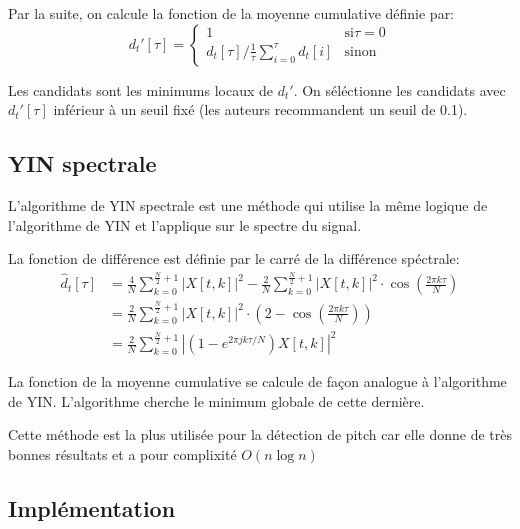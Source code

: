 \documentclass[]{article}
\begin{document}
Par la suite, on calcule la fonction de la moyenne cumulative définie
par: \[d_t'[\tau] = \begin{cases} 1 &\text{si} \tau = 0\\
d_t[\tau] / \frac{1}{\tau}\sum\limits_{i=0}^{\tau}d_t[i] &\text{sinon}
\end{cases}\]

Les candidats sont les minimums locaux de \(d_t'\). On séléctionne les
candidats avec \(d_t'[\tau]\) inférieur à un seuil fixé (les auteurs
recommandent un seuil de 0.1).

\hypertarget{yin-spectrale}{%
\subsection{YIN spectrale}\label{yin-spectrale}}

L'algorithme de YIN spectrale \emph{\citep{yinfft}} est une méthode qui
utilise la même logique de l'algorithme de YIN et l'applique sur le
spectre du signal.

La fonction de différence est définie par le carré de la différence
spéctrale: \begin{align*}
\hat{d}_t[\tau] &= \frac{4}{N} \sum\limits_{k=0}^{\frac{N}{2}+1} \left\lvert X[t,k] \right\rvert^2
       - \frac{2}{N} \sum\limits_{k=0}^{\frac{N}{2}+1} \left\lvert X[t,k] \right\rvert^2
       \cdot \cos \left( \frac{2\pi k\tau}{N} \right) \\
    &= \frac{2}{N} \sum\limits_{k=0}^{\frac{N}{2}+1} \left\lvert X[t,k] \right\rvert^2
       \cdot \left( 2 - \cos \left( \frac{2\pi k\tau}{N} \right) \right) \\
    &= \frac{2}{N} \sum\limits_{k=0}^{\frac{N}{2}+1}
       \left\lvert\left( 1-e^{2\pi jk\tau/N} \right) X[t,k] \right\rvert^2
\end{align*}

La fonction de la moyenne cumulative se calcule de façon analogue à
l'algorithme de YIN. L'algorithme cherche le minimum globale de cette
dernière.

Cette méthode est la plus utilisée pour la détection de pitch car elle
donne de très bonnes résultats et a pour complixité \(O(n\log n)\)

\hypertarget{implementation-1}{%
\subsection{Implémentation}\label{implementation-1}}
\end{document}
